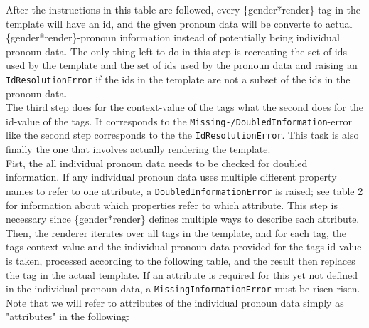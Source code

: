 \documentclass{article}
\begin{document}
    After the instructions in this table are followed, every \{gender*render\}-tag in the template will have an id, and the given pronoun data will be converte to actual \{gender*render\}-pronoun information instead of potentially being individual pronoun data.
    The only thing left to do in this step is recreating the set of ids used by the template and the set of ids used by the pronoun data and raising an \texttt{IdResolutionError} if the ids in the template are not a subset of the ids in the pronoun data.\\

    The third step does for the context-value of the tags what the second does for the id-value of the tags.
    It corresponds to the \texttt{Missing-/DoubledInformation}-error like the second step corresponds to the the \texttt{IdResolutionError}.
    This task is also finally the one that involves actually rendering the template.\\

    Fist, the all individual pronoun data needs to be checked for doubled information.
    If any individual pronoun data uses multiple different property names to refer to one attribute, a \texttt{DoubledInformationError} is raised;
    see table 2 for information about which properties refer to which attribute.
    This step is necessary since \{gender*render\} defines multiple ways to describe each attribute.\\

    Then, the renderer iterates over all tags in the template, and for each tag, the tags context value and the individual pronoun data provided for the tags id value is taken, processed according to the following table, and the result then replaces the tag in the actual template.
    If an attribute is required for this yet not defined in the individual pronoun data, a \texttt{MissingInformationError} must be risen risen.
    Note that we will refer to attributes of the individual pronoun data simply as "attributes" in the following:
\end{document}
